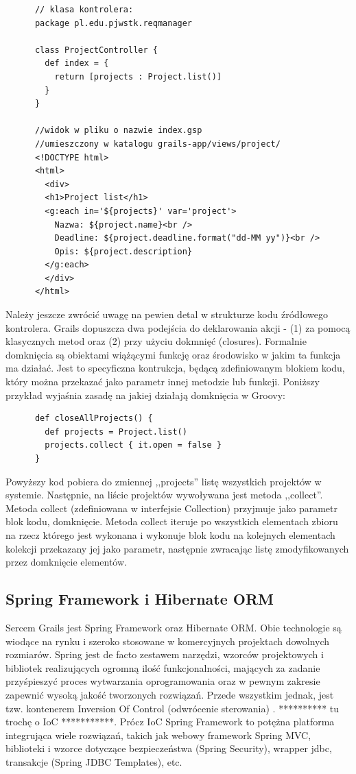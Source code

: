     \begin{verbatim} 
      // klasa kontrolera:
      package pl.edu.pjwstk.reqmanager

      class ProjectController {
        def index = { 
          return [projects : Project.list()]
        }   
      }

      //widok w pliku o nazwie index.gsp 
      //umieszczony w katalogu grails-app/views/project/
      <!DOCTYPE html>
      <html>
        <div>
        <h1>Project list</h1>
        <g:each in='${projects}' var='project'>
          Nazwa: ${project.name}<br />
          Deadline: ${project.deadline.format("dd-MM yy")}<br />
          Opis: ${project.description} 
        </g:each>
        </div>
      </html>

    \end{verbatim}

    Należy jeszcze zwrócić uwagę na pewien detal w strukturze kodu źródłowego kontrolera. Grails dopuszcza dwa podejścia do deklarowania akcji - (1) za pomocą klasycznych metod oraz (2) przy użyciu dokmnięć (closures). Formalnie domknięcia są obiektami wiążącymi funkcję oraz środowisko w jakim ta funkcja ma działać. Jest to specyficzna kontrukcja, będącą zdefiniowanym blokiem kodu, który można przekazać jako parametr innej metodzie lub funkcji. Poniższy przykład wyjaśnia zasadę na jakiej działają domknięcia w Groovy: 
    
    \begin{verbatim}
      def closeAllProjects() {
        def projects = Project.list()
        projects.collect { it.open = false }
      }
    \end{verbatim} 
    
    Powyższy kod pobiera do zmiennej ,,projects'' listę wszystkich projektów w systemie. Następnie, na liście projektów wywoływana jest metoda ,,collect''. Metoda collect (zdefiniowana w interfejsie Collection) przyjmuje jako parametr blok kodu, domknięcie. Metoda collect iteruje po wszystkich elementach zbioru na rzecz którego jest wykonana i wykonuje blok kodu na kolejnych elementach kolekcji przekazany jej jako parametr, następnie zwracając listę zmodyfikowanych przez domknięcie elementów.

    \subsection{Spring Framework i Hibernate ORM}

      Sercem Grails jest Spring Framework oraz Hibernate ORM. Obie technologie są wiodące na rynku i szeroko stosowane w komercyjnych projektach dowolnych rozmiarów. Spring jest de facto zestawem narzędzi, wzorców projektowych i bibliotek realizujących ogromną ilość funkcjonalności, mających za zadanie przyśpieszyć proces wytwarzania oprogramowania oraz w pewnym zakresie zapewnić wysoką jakość tworzonych rozwiązań. Przede wszystkim jednak, jest tzw. kontenerem Inversion Of Control (odwrócenie sterowania) \cite{MFow01}. ********** tu trochę o IoC ***********. Prócz IoC Spring Framework to potężna platforma integrująca wiele rozwiązań, takich jak webowy framework Spring MVC, biblioteki i wzorce dotyczące bezpieczeństwa (Spring Security), wrapper jdbc, transakcje (Spring JDBC Templates), etc.

